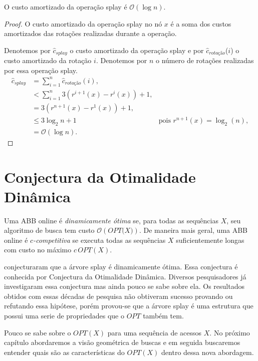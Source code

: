 \begin{theorem}
    O custo amortizado da operação splay é \( \mathcal{O}(\log n) \).
\end{theorem}

\begin{proof}
    O custo amortizado da operação splay no nó $x$ é a soma dos custos amortizados das rotações realizadas durante a operação.

    Denotemos por $\hat{c}_{\textit{splay}}$ o custo amortizado da operação splay e por $\hat{c}_{\textit{rotação}}$($i$) o custo amortizado da rotação $i$. Denotemos por $n$ o número de rotações realizadas por essa operação splay.
    \begin{align*}
        \hat{c}_{\textit{splay}} &= \sum_{i = 1}^{n} \hat{c}_{\textit{rotação}}(i), \\
        &< \sum_{i = 1}^{n} {3(r^{i+1}(x) - r^{i}(x)) + 1}, \\
        &= 3(r^{n+1}(x) - r^{1}(x)) + 1, \\ 
        &\leq 3\log_2n + 1 \quad & \text{pois $r^{n+1}(x) = \log_2(n)$}, \\ 
        &= \mathcal{O}(\log n).
    \end{align*}
\end{proof}


\section{Conjectura da Otimalidade Dinâmica}

Uma ABB online é \textit{dinamicamente ótima} se, para todas as sequências $X$, seu algoritmo de busca tem custo $\mathcal{O}(\textit{OPT(X)})$. De maneira mais geral, uma ABB online é \textit{$c$-competitiva} se executa todas as sequências $X$ suficientemente longas com custo no máximo $c$\,$OPT(X)$.

\cite{selfadjustingbst} conjecturaram que a árvore splay é dinamicamente ótima. Essa conjectura é conhecida por Conjectura da Otimalidade Dinâmica. Diversos pesquisadores já investigaram essa conjectura mas ainda pouco se sabe sobre ela. Os resultados obtidos com essas décadas de pesquisa não obtiveram sucesso provando ou refutando essa hipótese, porém provou-se que a árvore splay é uma estrutura que possui uma serie de propriedades que o $OPT$ também tem. 

Pouco se sabe sobre o $OPT(X)$ para uma sequência de acessos $X$. No próximo capítulo abordaremos a visão geométrica de buscas e em seguida buscaremos entender quais são as características do $OPT(X)$ dentro dessa nova abordagem. 